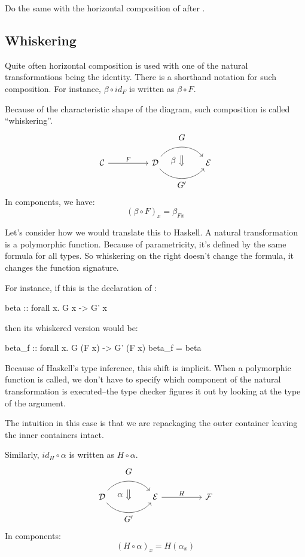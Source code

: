 \documentclass[DaoFP]{subfiles}
\begin{document}
\begin{exercise}
Do the same with the horizontal composition of  after . 
\end{exercise}

\subsection{Whiskering}

Quite often horizontal composition is used with one of the natural transformations being the identity. There is a shorthand notation for such composition. For instance, $\beta \circ id_F$ is written as $\beta \circ F$. 

Because of the characteristic shape of the diagram, such composition is called ``whiskering''.
\[
\begin{tikzcd}[column sep=huge]
\mathcal{C}
 \arrow[r, "F"]
 &
\mathcal{D}
  \arrow[bend left=50]{r}[name=U1, label=above:$G$]{}
  \arrow[bend right=50]{r}[name=D1, label=below:$G'$]{} 
 &
\mathcal{E}
  \arrow[shorten <=10pt,shorten >=10pt,Rightarrow,to path={(U1) -- node[label=left:$\beta$] {} (D1)}]{}
\end{tikzcd}
\]
In components, we have:
\[ (\beta \circ F)_x = \beta_{F x} \]

Let's consider how we would translate this to Haskell. A natural transformation is a polymorphic function. Because of parametricity, it's defined by the same formula for all types. So whiskering on the right doesn't change the formula, it changes the function signature. 

For instance, if this is the declaration of :
\begin{haskell}
beta :: forall x. G x -> G' x
\end{haskell}
then its whiskered version would be:
\begin{haskell}
beta_f :: forall x. G (F x) -> G' (F x)
beta_f = beta
\end{haskell}
Because of Haskell's type inference, this shift is implicit. When a polymorphic function is called, we don't have to specify which component of the natural transformation is executed--the type checker figures it out by looking at the type of the argument. 

The intuition in this case is that we are repackaging the outer container leaving the inner containers intact.

Similarly, $id_H \circ \alpha$ is written as $H \circ \alpha$.
\[
\begin{tikzcd}[column sep=huge]
\mathcal{D}
  \arrow[bend left=50]{r}[name=U, label=above:$G$]{}
  \arrow[bend right=50]{r}[name=D, label=below:$G'$]{} 
 &
\mathcal{E}
\arrow[r, "H"]
&
\mathcal{F}
  \arrow[shorten <=10pt,shorten >=10pt,Rightarrow,to path={(U) -- node[label=left:$\alpha$] {} (D)}]{}
\end{tikzcd}
\]
In components:
\[(H \circ \alpha)_x = H (\alpha_x) \]
\end{document}
